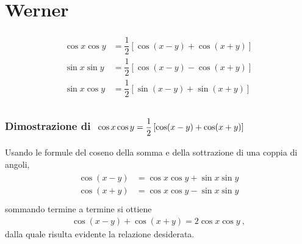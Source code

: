 \documentclass[letterpaper,10pt,english]{jupyterBook}
\begin{document}
\section{Werner}
\label{\detokenize{ch/trigonometry:werner}}\begin{equation*}
\begin{split}\begin{aligned}
  \cos x \cos y & = \dfrac{1}{2} \left[ \cos( x - y ) + \cos ( x + y ) \right] \\
  \sin x \sin y & = \dfrac{1}{2} \left[ \cos( x - y ) - \cos ( x + y ) \right] \\
  \sin x \cos y & = \dfrac{1}{2} \left[ \sin( x - y ) + \sin ( x + y ) \right] \\
\end{aligned}\end{split}
\end{equation*}\subsubsection*{Dimostrazione di \protect\(\ \cos x \cos y = \dfrac{1}{2} \left[ \cos( x - y ) + \cos ( x + y ) \right]\protect\)}

\sphinxAtStartPar
Usando le formule del coseno della somma e della sottrazione di una coppia di angoli,
\begin{equation*}
\begin{split}\begin{aligned}
  \cos( x - y ) & = \cos x \cos y + \sin x \sin y \\
  \cos( x + y ) & = \cos x \cos y - \sin x \sin y \\
\end{aligned}\end{split}
\end{equation*}
\sphinxAtStartPar
sommando termine a termine si ottiene
\begin{equation*}
\begin{split}\cos (x - y) + \cos( x + y ) = 2 \cos x \cos y \ ,\end{split}
\end{equation*}
\sphinxAtStartPar
dalla quale risulta evidente la relazione desiderata.
\end{document}
